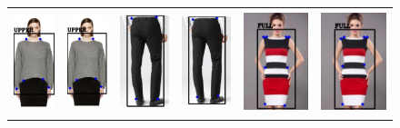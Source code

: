 \documentclass[conference]{IEEEtran}
\begin{document}
\begin{figure}
\centering
\begin{tabular} {cccccc}
{\includegraphics[align=c, width = 0.5in, height= 3cm]{images/gt_1.png}} & 
{\includegraphics[align=c, width = 0.5in, height= 3cm]{images/p_1.png}} &
{\includegraphics[align=c, width = 0.6in, height= 3cm]{images/gt_2.PNG}} &
{\includegraphics[align=c, width = 0.6in, height= 3cm]{images/p_2.PNG}} &
{\includegraphics[align=c, width = 0.8in, height= 3cm]{images/gt_3.PNG}} & 
{\includegraphics[align=c, width = 0.8in, height= 3cm]{images/p_3.PNG}}\\

\end{tabular}
\end{figure}
\end{document}
